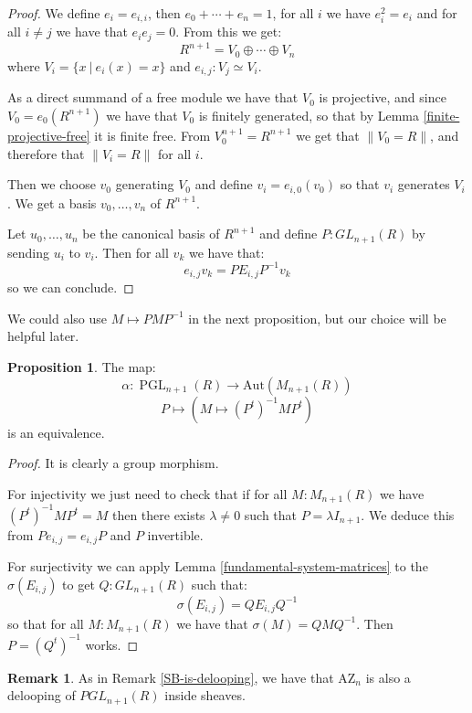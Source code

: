 \documentclass[10pt,a4paper]{article}
\theoremstyle{definition}
\newtheorem{remark}[theorem]{Remark}
\newtheorem{proposition}[theorem]{Proposition}
\DeclareMathOperator{\PGL}{PGL}
\newcommand{\AZ}{\mathrm{AZ}}
\newcommand{\propTrunc}[1]{\lVert #1 \rVert}
\newcommand{\Aut}{\mathrm{Aut}}
\begin{document}
\begin{proof}
We define $e_i = e_{i,i}$, then $e_0+\cdots+e_n = 1$, for all $i$ we have $e_i^2=e_i$ and for all $i\not=j$ we have that $e_ie_j=0$. From this we get:
\[R^{n+1} = V_0\oplus\cdots\oplus V_n\]
where $V_i = \{x\ |\ e_i(x)=x\}$ and $e_{i,j}:V_j\simeq V_i$.

As a direct summand of a free module we have that $V_0$ is projective, and since $V_0 = e_{0}(R^{n+1})$ we have that $V_0$ is finitely generated, so that by Lemma \ref{finite-projective-free} it is finite free. From $V_0^{n+1}=R^{n+1}$ we get that $\propTrunc{V_0=R}$, and therefore that $\propTrunc{V_i=R}$ for all $i$.

Then we choose $v_0$ generating $V_0$ and define $v_i = e_{i,0}(v_0)$ so that $v_i$ generates $V_i$. We get a basis $v_0,\hdots,v_n$ of $R^{n+1}$.

Let $u_0,\hdots,u_n$ be the canonical basis of $R^{n+1}$ and define $P:GL_{n+1}(R)$ by sending $u_i$ to $v_i$. Then for all $v_k$ we have that:
\[e_{i,j}v_k = PE_{i,j}P^{-1}v_k\]
so we can conclude.
\end{proof}

We could also use $M\mapsto PMP^{-1}$ in the next proposition, but our choice will be helpful later.

\begin{proposition}\label{Aut-MnR-PGL}
The map:
\[\alpha:\PGL_{n+1}(R)\to\Aut(M_{n+1}(R))\]
\[P\mapsto (M\mapsto (P^t)^{-1}MP^t)\]
is an equivalence.
\end{proposition}

\begin{proof}
It is clearly a group morphism. 

For injectivity we just need to check that if for all $M:M_{n+1}(R)$ we have $(P^t)^{-1}MP^t=M$ then there exists $\lambda\not=0$ such that $P=\lambda I_{n+1}$. We deduce this from $Pe_{i,j} = e_{i,j}P$ and $P$ invertible.

For surjectivity we can apply Lemma \ref{fundamental-system-matrices} to the $\sigma(E_{i,j})$ to get $Q:GL_{n+1}(R)$ such that:
\[\sigma(E_{i,j}) = QE_{i,j}Q^{-1}\]
so that for all $M:M_{n+1}(R)$ we have that $\sigma(M) = QMQ^{-1}$. Then $P = (Q^t)^{-1}$ works.
\end{proof}

\begin{remark}\label{AZ-is-delooping}
As in Remark \ref{SB-is-delooping}, we have that $\AZ_n$ is also a delooping of $PGL_{n+1}(R)$ inside sheaves.
\end{remark}
\end{document}
